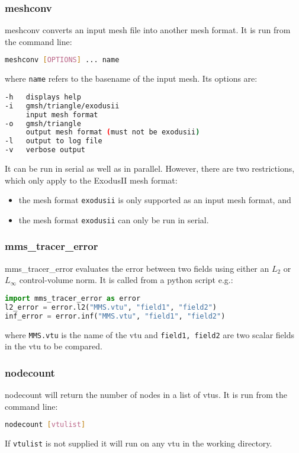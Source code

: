 \subsubsection{meshconv}
\label{sec:meshconv}
meshconv converts an input mesh file into another mesh format. It is run from the command line:
\begin{lstlisting}[language = Bash]
meshconv [OPTIONS] ... name
\end{lstlisting}
where \texttt{name} refers to the basename of the input mesh. Its options are:
\begin{lstlisting}[language = Bash]
-h   displays help
-i   gmsh/triangle/exodusii
     input mesh format
-o   gmsh/triangle
     output mesh format (must not be exodusii)
-l   output to log file
-v   verbose output
\end{lstlisting}
It can be run in serial as well as in parallel. However, there are two restrictions, which only apply to the ExodusII mesh format:
\begin{itemize}
 \item the mesh format \texttt{exodusii} is only supported as an input mesh format, and
 \item the mesh format \texttt{exodusii} can only be run in serial.
\end{itemize}



\subsubsection{mms\_tracer\_error}
\label{sec:mms_tracer_error}

mms\_tracer\_error evaluates the error between two fields using either an $L_2$ or $L_\infty$ control-volume norm. It is called from a python script e.g.:
\begin{lstlisting}[language = python]
import mms_tracer_error as error
l2_error = error.l2("MMS.vtu", "field1", "field2")
inf_error = error.inf("MMS.vtu", "field1", "field2")
\end{lstlisting}
where \lstinline[language = python]+MMS.vtu+ is the name of the vtu and \lstinline[language = python]+field1, field2+ are two scalar fields in the vtu to be compared.


\subsubsection{nodecount}
\label{sec:nodecount}
nodecount will return the number of nodes in a list of vtus. It is run from the command line:
\begin{lstlisting}[language = Bash]
nodecount [vtulist]
\end{lstlisting}
If \lstinline[language = Bash]+vtulist+ is not supplied it will run on any vtu in the working directory.

